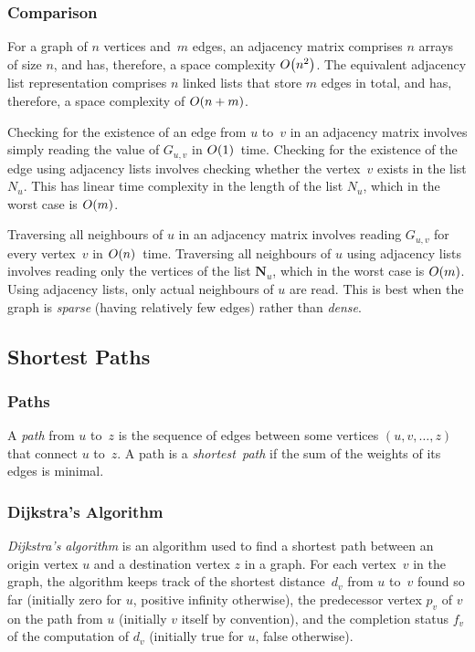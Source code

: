 \subsubsection{Comparison}

For a graph of \( n \) vertices and~\( m \) edges, an adjacency matrix comprises \( n \) arrays of size \( n \), and has, therefore, a space complexity \( O\!\left(n^{2}\right) \).
The equivalent adjacency list representation comprises \( n \) linked lists that store \( m \) edges in total, and has, therefore, a space complexity of \( O\!\left(n + m\right) \).

Checking for the existence of an edge from \( u \) to~\( v \) in an adjacency matrix involves simply reading the value of \( G_{u,v} \) in \( O\!\left(1\right) \)~time.
Checking for the existence of the edge using adjacency lists involves checking whether the vertex~\( v \) exists in the list \( N_{u} \).
This has linear time complexity in the length of the list \( N_{u} \), which in the worst case is \( O\!\left(m\right) \).

Traversing all neighbours of \( u \) in an adjacency matrix involves reading \( G_{u,v} \) for every vertex~\( v \) in \( O\!\left(n\right) \)~time.
Traversing all neighbours of \( u \) using adjacency lists involves reading only the vertices of the list \( \boldsymbol{N}_{u} \), which in the worst case is \( O\!\left(m\right) \).
Using adjacency lists, only actual neighbours of \( u \) are read.
This is best when the graph is \emph{sparse} (having relatively few edges) rather than \emph{dense}.

\subsection{Shortest Paths}

\subsubsection{Paths}

A \emph{path} from \( u \) to~\( z \) is the sequence of edges between some vertices \( \left( u, v, \ldots, z \right) \) that connect \( u \) to~\( z \).
A path is a \emph{shortest~path} if the sum of the weights of its edges is minimal.

\subsubsection{Dijkstra's Algorithm}

\emph{Dijkstra's algorithm} is an algorithm used to find a shortest path between an origin vertex \( u \) and a destination vertex \( z \) in a graph.
For each vertex~\( v \) in the graph, the algorithm keeps track of the shortest distance~\( d_{v} \) from \( u \) to~\( v \) found so far (initially zero for \( u \), positive infinity otherwise), the predecessor vertex \( p_{v} \) of \( v \) on the path from \( u \) (initially \( v \) itself by convention), and the completion status \( f_{v} \) of the computation of \( d_{v} \) (initially true for \( u \), false otherwise).

